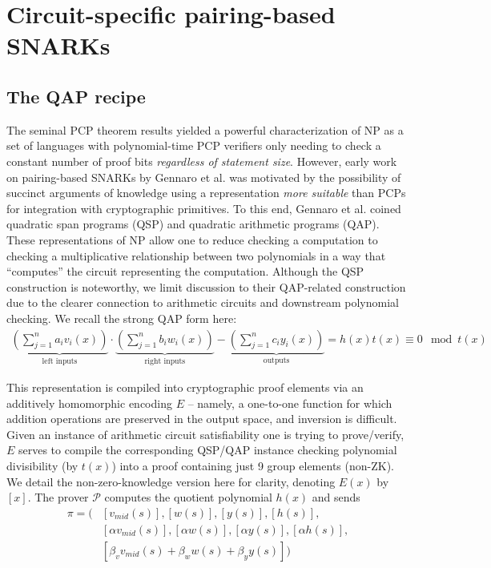 \section{Circuit-specific pairing-based SNARKs}
\subsection{The QAP recipe}
\noindent The seminal PCP theorem results \cite{pcpthm1, pcpthm2} yielded a powerful characterization of NP as a set of languages with polynomial-time PCP verifiers only needing to check a constant number of proof bits \textit{regardless of statement size}. However, early work on pairing-based SNARKs by Gennaro et al. \cite{snarknopcp} was motivated by the possibility of succinct arguments of knowledge using a representation \textit{more suitable} than PCPs for integration with cryptographic primitives. To this end, Gennaro et al. \cite{snarknopcp} coined quadratic span programs (QSP) and quadratic arithmetic programs (QAP). These representations of NP allow one to reduce checking a computation to checking a multiplicative relationship between two polynomials in a way that ``computes'' the circuit representing the computation. Although the QSP construction is noteworthy, we limit discussion to their QAP-related construction due to the clearer connection to arithmetic circuits and downstream polynomial checking. We recall the strong QAP form here:
\begin{align}
\underbrace{\left(\sum_{j=1}^n a_i v_i(x)\right)}_{\text{left inputs}} \cdot \underbrace{\left(\sum_{j=1}^n b_i w_i(x)\right)}_{\text{right inputs}} - \underbrace{\left(\sum_{j=1}^n c_i y_i(x)\right)}_{\text{outputs}} = h(x) t(x) \equiv 0 \mod t(x)
\end{align}

\noindent This representation is compiled into cryptographic proof elements via an additively homomorphic encoding $E$ -- namely, a one-to-one function for which addition operations are preserved in the output space, and inversion is difficult. Given an instance of arithmetic circuit satisfiability one is trying to prove/verify, $E$ serves to compile the corresponding QSP/QAP instance checking polynomial divisibility (by $t(x)$) into a proof containing just 9 group elements (non-ZK). We detail the non-zero-knowledge version here for clarity, denoting $E(x)$ by $[x]$. The prover $\mathcal{P}$ computes the quotient polynomial $h(x)$ and sends
\begin{align*}
    \pi = \Big(&[v_{mid}(s)], [w(s)], [y(s)], [h(s)], \\ 
    &[\alpha v_{mid}(s)], [\alpha w(s)], [\alpha y(s)], [\alpha h(s)], \\ 
    &[\beta_v v_{mid}(s) + \beta_w w(s) + \beta_y y(s)]\Big)
\end{align*}

